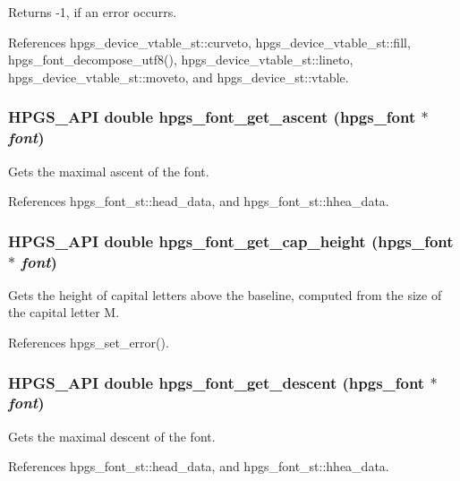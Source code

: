 Returns -1, if an error occurrs. 

References hpgs\_\-device\_\-vtable\_\-st::curveto, hpgs\_\-device\_\-vtable\_\-st::fill, hpgs\_\-font\_\-decompose\_\-utf8(), hpgs\_\-device\_\-vtable\_\-st::lineto, hpgs\_\-device\_\-vtable\_\-st::moveto, and hpgs\_\-device\_\-st::vtable.
\subsubsection[hpgs\_\-font\_\-get\_\-ascent]{\setlength{\rightskip}{0pt plus 5cm}HPGS\_\-API double hpgs\_\-font\_\-get\_\-ascent ({\bf hpgs\_\-font} $\ast$ {\em font})}\label{group__font_g4c31ff0e52736eb6ab55a3bc0c178b24}


Gets the maximal ascent of the font. 

References hpgs\_\-font\_\-st::head\_\-data, and hpgs\_\-font\_\-st::hhea\_\-data.
\subsubsection[hpgs\_\-font\_\-get\_\-cap\_\-height]{\setlength{\rightskip}{0pt plus 5cm}HPGS\_\-API double hpgs\_\-font\_\-get\_\-cap\_\-height ({\bf hpgs\_\-font} $\ast$ {\em font})}\label{group__font_gb75c848878a655dd0a24286772879136}


Gets the height of capital letters above the baseline, computed from the size of the capital letter M. 

References hpgs\_\-set\_\-error().
\subsubsection[hpgs\_\-font\_\-get\_\-descent]{\setlength{\rightskip}{0pt plus 5cm}HPGS\_\-API double hpgs\_\-font\_\-get\_\-descent ({\bf hpgs\_\-font} $\ast$ {\em font})}\label{group__font_g0ba261087b2bb68426ec3924bbf7f2dd}


Gets the maximal descent of the font. 

References hpgs\_\-font\_\-st::head\_\-data, and hpgs\_\-font\_\-st::hhea\_\-data.
